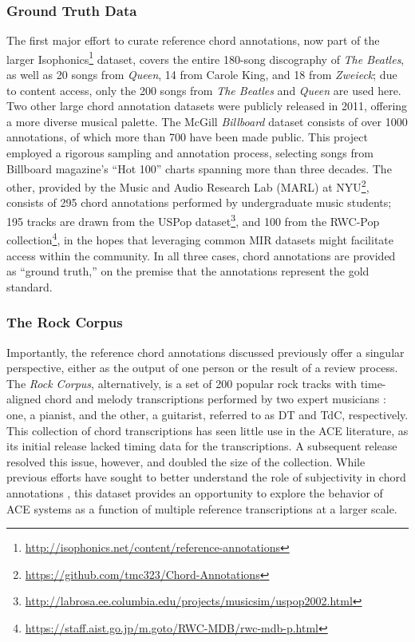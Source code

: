\documentclass{article}
\begin{document}
\subsubsection{Ground Truth Data}
\label{subsubsec:ground_truth}

The first major effort to curate reference chord annotations, now part of the larger Isophonics\footnote{\url{http://isophonics.net/content/reference-annotations}} dataset, covers the entire 180-song discography of \emph{The Beatles}, as well as 20 songs from \emph{Queen}, 14 from Carole King, and 18 from \emph{Zweieck};
due to content access, only the 200 songs from \emph{The Beatles} and \emph{Queen} are used here.
Two other large chord annotation datasets were publicly released in 2011, offering a more diverse musical palette.
The McGill \emph{Billboard} dataset consists of over 1000 annotations, of which more than 700 have been made public.
This project employed a rigorous sampling and annotation process, selecting songs from Billboard magazine's ``Hot 100'' charts spanning more than three decades.
The other, provided by the Music and Audio Research Lab (MARL) at NYU\footnote{\url{https://github.com/tmc323/Chord-Annotations}}, consists of 295 chord annotations performed by undergraduate music students;
195 tracks are drawn from the USPop dataset\footnote{\url{http://labrosa.ee.columbia.edu/projects/musicsim/uspop2002.html}}, and 100 from the RWC-Pop collection\footnote{\url{https://staff.aist.go.jp/m.goto/RWC-MDB/rwc-mdb-p.html}}, in the hopes that leveraging common MIR datasets might facilitate access within the community.
In all three cases, chord annotations are provided as ``ground truth,'' on the premise that the annotations represent the gold standard.


\subsubsection{The Rock Corpus}

Importantly, the reference chord annotations discussed previously offer a  singular perspective, either as the output of one person or the result of a review process.
The \emph{Rock Corpus}, alternatively, is a set of 200 popular rock tracks with time-aligned chord and melody transcriptions performed by two expert musicians \cite{deClercq2011Corpus}:
one, a pianist, and the other, a guitarist, referred to as DT and TdC, respectively.
This collection of chord transcriptions has seen little use in the ACE literature, as its initial release lacked timing data for the transcriptions.
A subsequent release resolved this issue, however, and doubled the size of the collection.
While previous efforts have sought to better understand the role of subjectivity in chord annotations \cite{Ni2013Understanding}, this dataset provides an opportunity to explore the behavior of ACE systems as a function of multiple reference transcriptions at a larger scale.
\end{document}
